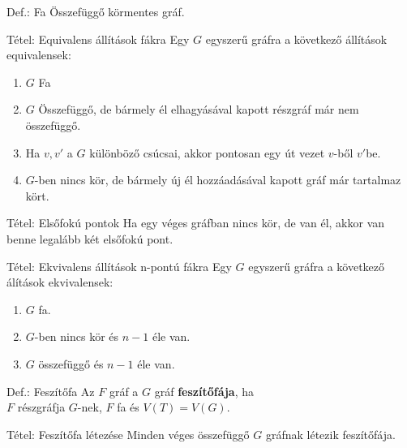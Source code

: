 \documentclass{beamer}
\begin{document}
\begin{frame}
\begin{block}{Def.: Fa}
Összefüggő körmentes gráf.
\end{block}
\end{frame}

\begin{frame}
\begin{block}{Tétel: Equivalens állítások fákra}
Egy $G$ egyszerű gráfra a következő állítások equivalensek:
\begin{enumerate}
\item $G$ Fa
\item $G$ Összefüggő, de bármely él elhagyásával kapott részgráf már nem összefüggő.
\item Ha $v, v'$ a $G$ különböző csúcsai, akkor pontosan egy út vezet $v$-ből $v'$be.
\item $G$-ben nincs kör, de bármely új él hozzáadásával kapott gráf már tartalmaz kört.
\end{enumerate}
\end{block}

\begin{block}{Tétel: Elsőfokú pontok}
Ha egy véges gráfban nincs kör, de van él, akkor van benne legalább két elsőfokú pont.
\end{block}
\end{frame}

\begin{frame} 
\begin{block}{Tétel: Ekvivalens állítások n-pontú fákra}
Egy $G$ egyszerű gráfra a következő álítások ekvivalensek:
\begin{enumerate}
\item $G$ fa.
\item $G$-ben nincs kör és $n - 1$ éle van.
\item $G$ összefüggő és $n - 1$ éle van.
\end{enumerate}
\end{block}

\begin{block}{Def.: Feszítőfa}
Az $F$ gráf a $G$ gráf \textbf{feszítőfája}, ha\\
$F$ részgráfja $G$-nek, $F$ fa és $V(T) = V(G)$.
\end{block}

\begin{block}{Tétel: Feszítőfa létezése}
Minden véges összefüggő $G$ gráfnak létezik feszítőfája.
\end{block}

\end{frame}
\end{document}
